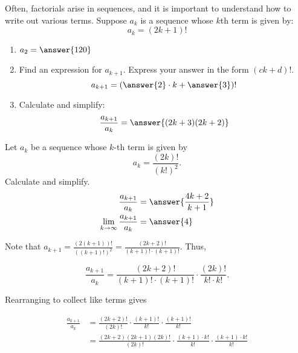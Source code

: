 \documentclass{ximera}
\begin{document}
\begin{exercise}
\begin{problem}
\begin{problem}
    
    
    
  \end{problem}
\end{problem}

\begin{problem}
  Often, factorials arise in sequences, and it is important to
  understand how to write out various terms. Suppose $a_k$ is a
  sequence whose $k$th term is given by:
  \[
  a_k = (2k+1)!
  \]
  \begin{enumerate}
  \item $a_2 = \answer{120}$
  \item Find an expression for $a_{k+1}$. Express your answer in the form $(ck+d)!$.
    \[
    a_{k+1} = \left(\answer{2} \cdot k + \answer{3}\right)!
    \]
  \item Calculate and simplify:
    \[
    \frac{a_{k+1}}{a_k} = \answer{(2k+3)(2k+2)}
    \]
  \end{enumerate}
\end{problem}

\begin{problem}
  Let $a_k$ be a sequence whose $k$-th term is given by
  \[
  a_k = \frac{(2k)!}{(k!)^2}.
  \]
  Calculate and simplify.
  \begin{align*}
    \frac{a_{k+1}}{a_k} &= \answer{\frac{4k+2}{k+1}}\\
    \lim_{k\to\infty} \frac{a_{k+1}}{a_k} &= \answer{4}
  \end{align*}
  
  \begin{hint}
  Note that $a_{k+1} = \frac{(2(k+1))!}{((k+1)!)^2} = \frac{(2k+2)!}{(k+1)! \cdot (k+1)!}$.  Thus,
  
  \[
   \frac{a_{k+1}}{a_k} = \frac{(2k+2)!}{(k+1)! \cdot (k+1)!} \cdot \frac{(2k)!}{k! \cdot k!}.
  \]
  
  Rearranging to collect like terms gives
  
  \begin{align*}
   \frac{a_{k+1}}{a_k} &= \frac{(2k+2)!}{(2k)!} \cdot \frac{(k+1)!}{k!} \cdot \frac{(k+1)!}{k!} \\
   &= \frac{(2k+2)(2k+1)(2k)!}{(2k)!} \cdot \frac{(k+1) \cdot k!}{k!} \cdot \frac{(k+1) \cdot k!}{k!}\\
  \end{align*}
  \end{hint}
\end{problem}

\end{exercise}
\end{document}
